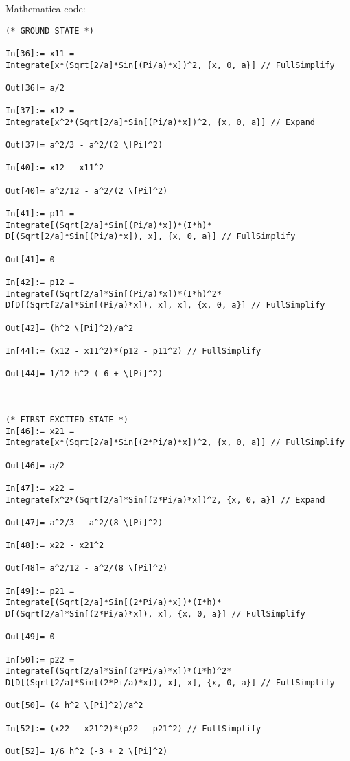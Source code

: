 \documentclass{article}
\theoremstyle{definition}
\begin{document}
Mathematica code:
\begin{lstlisting}
(* GROUND STATE *)

In[36]:= x11 = 
Integrate[x*(Sqrt[2/a]*Sin[(Pi/a)*x])^2, {x, 0, a}] // FullSimplify

Out[36]= a/2

In[37]:= x12 = 
Integrate[x^2*(Sqrt[2/a]*Sin[(Pi/a)*x])^2, {x, 0, a}] // Expand

Out[37]= a^2/3 - a^2/(2 \[Pi]^2)

In[40]:= x12 - x11^2

Out[40]= a^2/12 - a^2/(2 \[Pi]^2)

In[41]:= p11 = 
Integrate[(Sqrt[2/a]*Sin[(Pi/a)*x])*(I*h)*
D[(Sqrt[2/a]*Sin[(Pi/a)*x]), x], {x, 0, a}] // FullSimplify

Out[41]= 0

In[42]:= p12 = 
Integrate[(Sqrt[2/a]*Sin[(Pi/a)*x])*(I*h)^2*
D[D[(Sqrt[2/a]*Sin[(Pi/a)*x]), x], x], {x, 0, a}] // FullSimplify

Out[42]= (h^2 \[Pi]^2)/a^2

In[44]:= (x12 - x11^2)*(p12 - p11^2) // FullSimplify

Out[44]= 1/12 h^2 (-6 + \[Pi]^2)



(* FIRST EXCITED STATE *)
In[46]:= x21 = 
Integrate[x*(Sqrt[2/a]*Sin[(2*Pi/a)*x])^2, {x, 0, a}] // FullSimplify

Out[46]= a/2

In[47]:= x22 = 
Integrate[x^2*(Sqrt[2/a]*Sin[(2*Pi/a)*x])^2, {x, 0, a}] // Expand

Out[47]= a^2/3 - a^2/(8 \[Pi]^2)

In[48]:= x22 - x21^2

Out[48]= a^2/12 - a^2/(8 \[Pi]^2)

In[49]:= p21 = 
Integrate[(Sqrt[2/a]*Sin[(2*Pi/a)*x])*(I*h)*
D[(Sqrt[2/a]*Sin[(2*Pi/a)*x]), x], {x, 0, a}] // FullSimplify

Out[49]= 0

In[50]:= p22 = 
Integrate[(Sqrt[2/a]*Sin[(2*Pi/a)*x])*(I*h)^2*
D[D[(Sqrt[2/a]*Sin[(2*Pi/a)*x]), x], x], {x, 0, a}] // FullSimplify

Out[50]= (4 h^2 \[Pi]^2)/a^2

In[52]:= (x22 - x21^2)*(p22 - p21^2) // FullSimplify

Out[52]= 1/6 h^2 (-3 + 2 \[Pi]^2)
\end{lstlisting}
\end{document}
